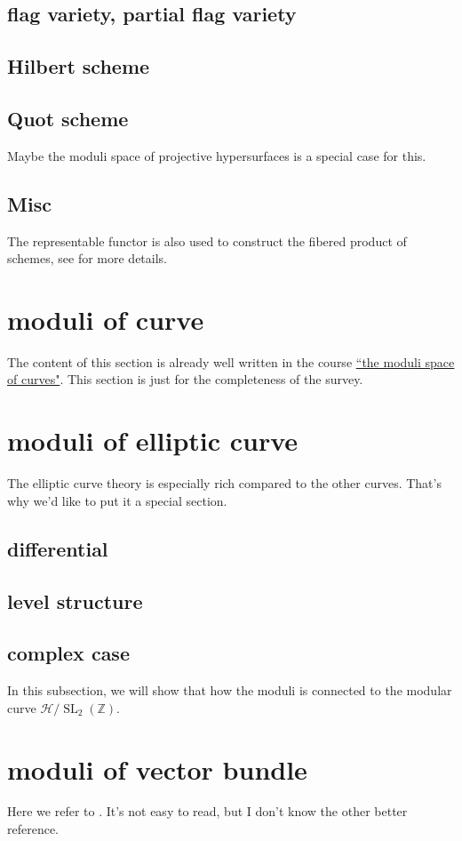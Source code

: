 \documentclass[reqno,11pt]{amsart}
\numberwithin{equation}{section}
\theoremstyle{plain}
\theoremstyle{plain}
\numberwithin{equation}{section}
\theoremstyle{remark}
\DeclareMathOperator{\SL}{\operatorname{SL}}
\begin{document}
\subsection{flag variety, partial flag variety}
\subsection{Hilbert scheme}
\subsection{Quot scheme}
Maybe the moduli space of projective hypersurfaces is a special case for this.
\subsection{Misc}The representable functor is also used to construct the fibered product of schemes, see \cite[9.1.6-7]{FOAG} for more details.
\section{moduli of curve}
The content of this section is already well written in the course \href{https://johannesschmitt.gitlab.io/moduli_of_curves}{``the moduli space of curves"}. This section is just for the completeness of the survey.

\section{moduli of elliptic curve}
The elliptic curve theory is especially rich compared to the other curves. That's why we'd like to put it a special section.
\subsection{differential}
\subsection{level structure}
\subsection{complex case}
In this subsection, we will show that how the moduli is connected to the modular curve $\mathcal{H}/\SL_2(\mathbb{Z})$.

\section{moduli of vector bundle}
Here we refer to \cite{huybrechts2010geometry}. It's not easy to read, but I don't know the other better reference.


\end{document}
